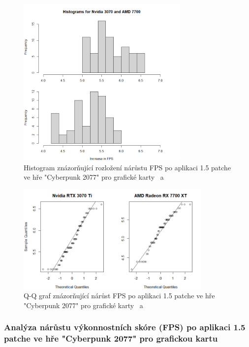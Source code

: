 \begin{figure}[h!]
    \centering
    \includegraphics[width=0.75\textwidth]{assets/histogram}
    \caption{Histogram znázorňující rozložení nárůstu FPS po aplikaci 1.5 patche ve hře "Cyberpunk 2077" pro grafické karty \nvidiaCard\ a \amdCard}
    \label{fig:histogram}
\end{figure}

\begin{figure}[h!]
    \centering
    \includegraphics[width=0.85\textwidth]{assets/qq}
    \caption{Q-Q graf znázorňující nárůst FPS po aplikaci 1.5 patche ve hře "Cyberpunk 2077" pro grafické karty \nvidiaCard\ a \amdCard}
    \label{fig:qq}
\end{figure}

\newpage
\subsubsection*{Analýza nárůstu výkonnostních skóre (FPS) po aplikaci 1.5 patche ve hře "Cyberpunk 2077" pro grafickou kartu \nvidiaCard}

